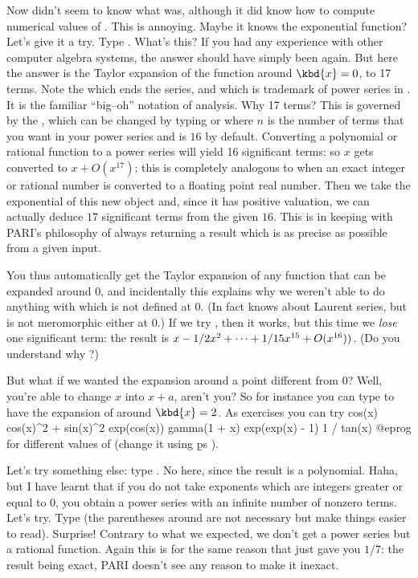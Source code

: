 \medskip
Now  didn't seem to know what  was, although it did know
how to compute numerical values of . This is annoying. Maybe it
knows the exponential function? Let's give it a try. Type .
What's this? If you had any experience with other computer algebra systems,
the answer should have simply been  again. But here the answer is
the Taylor expansion of the function around $\kbd{x}=0$, to 17 terms. Note
the  which ends the series, and which is trademark of power
series in . It is the familiar ``big--oh'' notation of analysis.
Why 17 terms? This is governed by the , which
can be changed by typing  or  where $n$ is the number of terms that you want in your power series
and is $16$ by default. Converting a polynomial or rational function to a
power series will yield 16 significant terms: so $x$ gets converted to $x +
O(x^{17})$; this is completely analogous to  when an exact
integer or rational number is converted to a floating point real number.
Then we take the exponential of this new object and, since it has positive
valuation, we can actually deduce $17$ significant terms from the given $16$.
This is in keeping with PARI's philosophy of always returning a result which
is as precise as possible from a given input.

You thus automatically get the Taylor expansion of any function that can be
expanded around $0$, and incidentally this explains why we weren't able to do
anything with  which is not defined at $0$. (In fact 
knows about Laurent series, but  is not meromorphic either at
$0$.) If we try , then it works, but this time we \emph{lose}
one significant term: the result is $x - 1/2\*x^2 + \dots + 1/15\*x^{15} +
O(x^{16}))$. (Do you understand why ?)

But what if we wanted the expansion around a point different from 0? Well,
you're able to change $x$ into $x+a$, aren't you? So for instance you can
type  to have the expansion of  around $\kbd{x}=2$. As
exercises you can try
\bprog
  cos(x)
  cos(x)^2 + sin(x)^2
  exp(cos(x))
  gamma(1 + x)
  exp(exp(x) - 1)
  1 / tan(x)
@eprog\noindent
for different values of  (change it using \b{ps}
).

Let's try something else: type . No  here, since
the result is a polynomial.  Haha, but I have learnt that if you do not take
exponents which are integers greater or equal to 0, you obtain a power series
with an infinite number of nonzero terms. Let's try.  Type
 (the parentheses around  are not necessary but
make things easier to read). Surprise! Contrary to what we expected, we don't
get a power series but a rational function. Again this is for the same reason
that  just gave you $1/7$: the result being exact, PARI doesn't see
any reason to make it inexact.

